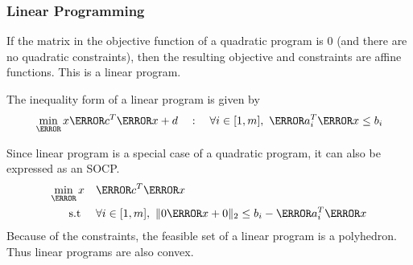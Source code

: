 \subsubsection{Linear Programming}
If the matrix in the objective function of a quadratic program is 0 (and there are no quadratic constraints), then the resulting objective and constraints are affine functions.
This is a linear program.
\begin{definition}
	The inequality form of a linear program is given by \[
		\min_\V{x} \V{c}^T\V{x} + d \quad : \quad \forall i\in[1,m],\ \V{a}_i^T\V{x} \leq b_i
	\]
	\label{defn:lp}
\end{definition}
Since linear program is a special case of a quadratic program, it can also be expressed as an SOCP.
\begin{align*}
	\min_\V{x} &\quad \V{c}^T\V{x}\\
	\text{s.t } &\quad \forall i\in[1,m],\ \|0\V{x} + 0\|_2 \leq b_i - \V{a}_i^T\V{x}
\end{align*}
Because of the constraints, the feasible set of a linear program is a polyhedron.
Thus linear programs are also convex.
